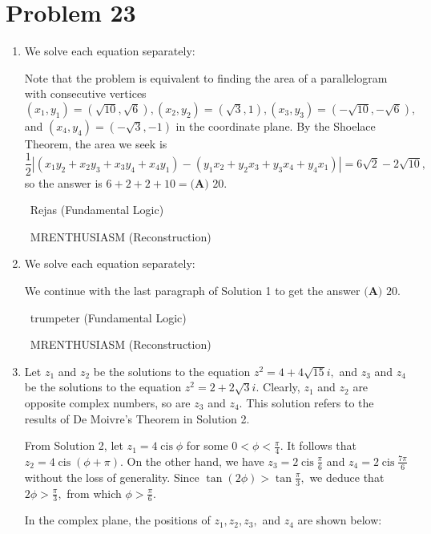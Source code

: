 \documentclass{article}%
\begin{document}
\section*{Problem 23}%
\label{sec:Problem23}%
\begin{enumerate}%
\item%
We solve each equation separately:

Note that the problem is equivalent to finding the area of a parallelogram with consecutive vertices $(x_1,y_1)=\left(\sqrt{10}, \sqrt{6}\right),(x_2,y_2)=\left(\sqrt{3},1\right),(x_3,y_3)=\left(-\sqrt{10},-\sqrt{6}\right),$ and $(x_4,y_4)=\left(-\sqrt{3}, -1\right)$ in the coordinate plane. By the Shoelace Theorem, the area we seek is \[\frac{1}{2} \left|(x_1y_2 + x_2y_3 + x_3y_4 + x_4y_1) - (y_1x_2 + y_2x_3 + y_3x_4 + y_4x_1)\right| = 6\sqrt2-2\sqrt{10},\] so the answer is $6+2+2+10=\boxed{\textbf{(A) } 20}.$

~Rejas (Fundamental Logic)

~MRENTHUSIASM (Reconstruction)

%
\item%
We solve each equation separately:

We continue with the last paragraph of Solution 1 to get the answer $\boxed{\textbf{(A) } 20}.$

~trumpeter (Fundamental Logic)

~MRENTHUSIASM (Reconstruction)

%
\item%
Let $z_1$ and $z_2$ be the solutions to the equation $z^2=4+4\sqrt{15}i,$ and $z_3$ and $z_4$ be the solutions to the equation $z^2=2+2\sqrt 3i.$ Clearly, $z_1$ and $z_2$ are opposite complex numbers, so are $z_3$ and $z_4.$ This solution refers to the results of De Moivre's Theorem in Solution 2.

From Solution 2, let $z_1=4\operatorname{cis}\phi$ for some $0<\phi<\frac{\pi}{4}.$ It follows that $z_2=4\operatorname{cis}(\phi+\pi).$ On the other hand, we have $z_3=2\operatorname{cis}\frac{\pi}{6}$ and $z_4=2\operatorname{cis}\frac{7\pi}{6}$ without the loss of generality. Since $\tan(2\phi)>\tan\frac{\pi}{3},$ we deduce that $2\phi>\frac{\pi}{3},$ from which $\phi>\frac{\pi}{6}.$

In the complex plane, the positions of $z_1,z_2,z_3,$ and $z_4$ are shown below:


\end{enumerate}
\end{document}

